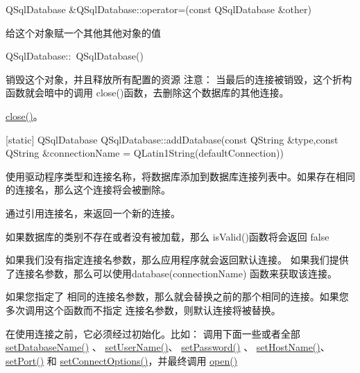 QSqlDatabase \&QSqlDatabase::operator=(const QSqlDatabase \&other)

给这个对象赋一个其他其他对象的值

QSqlDatabase::~QSqlDatabase()

销毁这个对象，并且释放所有配置的资源 注意： 当最后的连接被销毁，这个折构函数就会暗中的调用 close()函数，去删除这个数据库的其他连接。


\begin{notice}[另请参阅 ]
\href{https://github.com/QtDocumentCN/QtDocumentCN/blob/master/Src/S/QSqlDatabase/QSqlDatabase.md#void-qsqldatabaseclose}{close()}。
\end{notice}



[static] QSqlDatabase QSqlDatabase::addDatabase(const QString \&type,const QString \&connectionName = QLatin1String(defaultConnection))

使用驱动程序类型和连接名称，将数据库添加到数据库连接列表中。如果存在相同的连接名，那么这个连接将会被删除。

通过引用连接名，来返回一个新的连接。

如果数据库的类别不存在或者没有被加载，那么 isValid()函数将会返回 false

如果我们没有指定连接名参数，那么应用程序就会返回默认连接。 如果我们提供了连接名参数，那么可以使用database(connectionName) 函数来获取该连接。

\begin{notice}[警告]
如果您指定了 相同的连接名参数，那么就会替换之前的那个相同的连接。如果您多次调用这个函数而不指定 连接名参数，则默认连接将被替换。
\end{notice}


在使用连接之前，它必须经过初始化。比如： 调用下面一些或者全部 \href{https://github.com/QtDocumentCN/QtDocumentCN/blob/master/Src/S/QSqlDatabase/QSqlDatabase.md#void-qsqldatabasesetdatabasenameconst-qstring-name}{setDatabaseName()} 、 \href{https://github.com/QtDocumentCN/QtDocumentCN/blob/master/Src/S/QSqlDatabase/QSqlDatabase.md#void-qsqldatabasesetusernameconst-qstring-name}{setUserName()}、 \href{https://github.com/QtDocumentCN/QtDocumentCN/blob/master/Src/S/QSqlDatabase/QSqlDatabase.md#void-qsqldatabasesetpasswordconst-qstring-password}{setPassword()} 、 \href{https://github.com/QtDocumentCN/QtDocumentCN/blob/master/Src/S/QSqlDatabase/QSqlDatabase.md#void-qsqldatabasesethostnameconst-qstring-host}{setHostName()}、 \href{https://github.com/QtDocumentCN/QtDocumentCN/blob/master/Src/S/QSqlDatabase/QSqlDatabase.md#void-qsqldatabasesetportint-port}{setPort()} 和 \href{https://github.com/QtDocumentCN/QtDocumentCN/blob/master/Src/S/QSqlDatabase/QSqlDatabase.md#void-qsqldatabasesetconnectoptionsconst-qstring-options--qstring}{setConnectOptions()}，并最终调用 \href{https://github.com/QtDocumentCN/QtDocumentCN/blob/master/Src/S/QSqlDatabase/QSqlDatabase.md#bool-qsqldatabaseopen}{open()}



